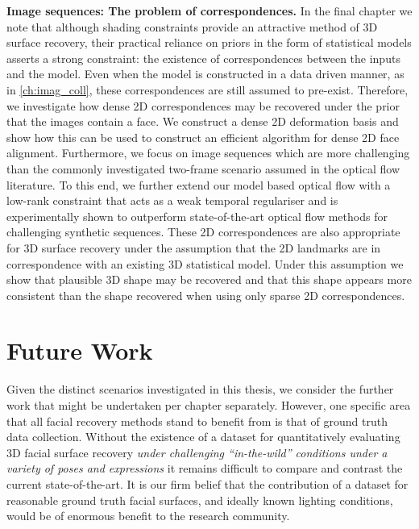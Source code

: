 \textbf{Image sequences: The problem of correspondences.}
In the final chapter we note that although shading constraints provide an
attractive method of 3D surface recovery, their practical reliance on
priors in the form of statistical models asserts a strong constraint: the 
existence of correspondences between the inputs and the model. Even when the
model is constructed in a data driven manner, as in \cref{ch:imag_coll},
these correspondences are still assumed to pre-exist. Therefore, we investigate
how dense 2D correspondences may be recovered under the prior that the images
contain a face. We construct a dense 2D deformation basis and show how this can
be used to construct an efficient algorithm for dense 2D face alignment. 
Furthermore, we focus on image sequences which are more challenging than the
commonly investigated two-frame scenario assumed in the optical flow literature.
To this end, we further extend our model based optical flow with a low-rank
constraint that acts as a weak temporal regulariser and is experimentally shown
to outperform state-of-the-art optical flow methods for challenging synthetic
sequences. These 2D correspondences are also appropriate for 3D surface recovery
under the assumption that the 2D landmarks are in correspondence with an
existing 3D statistical model. Under this assumption we show that plausible
3D shape may be recovered and that this shape appears more consistent than
the shape recovered when using only sparse 2D correspondences.
\section{Future Work}
Given the distinct scenarios investigated in this thesis, we consider
the further work that might be undertaken per chapter separately. However,
one specific area that all facial recovery methods stand to benefit from
is that of ground truth data collection. Without the existence of a dataset
for quantitatively evaluating 3D facial surface recovery \textit{under
challenging ``in-the-wild'' conditions under a variety of poses and expressions}
it remains difficult to compare and contrast the current state-of-the-art.
It is our firm belief that the contribution of a dataset for reasonable
ground truth facial surfaces, and ideally known lighting conditions, would
be of enormous benefit to the research community.


